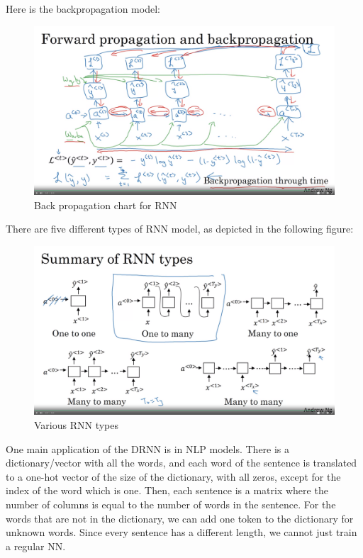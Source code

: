 \documentclass[12pt]{report}
\begin{document}
Here is the backpropagation model:

\begin{figure}[H]
  \centering
  \includegraphics[trim =0.0cm 0.0cm 0.0cm 0.0cm, clip, scale=0.15]{pics/RNNback.png}
  \caption{Back propagation chart for RNN}
\end{figure}

There are five different types of RNN model, as depicted in the following figure:
\begin{figure}[H]
  \centering
  \includegraphics[trim =0.0cm 0.0cm 0.0cm 0.0cm, clip, scale=0.15]{pics/RNNtypes.png}
  \caption{Various RNN types}
\end{figure}



One main application of the DRNN is in NLP models. There is a dictionary/vector with all the words, and each word of the sentence is translated to a one-hot vector of the size of the dictionary, with all zeros, except for the index of the word which is one. Then, each sentence is a matrix where the number of columns is equal to the number of words in the sentence. For the words that are not in the dictionary, we can add one token to the dictionary for unknown words. Since every sentence has a different length, we cannot just train a regular NN.
\end{document}
